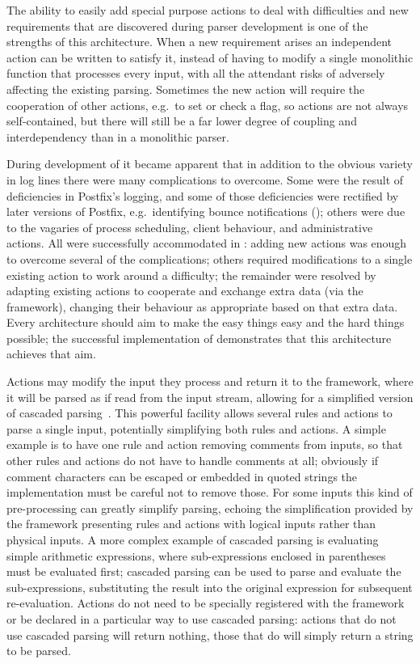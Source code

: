 The ability to easily add special purpose actions to deal with difficulties
and new requirements that are discovered during parser development is one
of the strengths of this architecture.  When a new requirement arises an
independent action can be written to satisfy it, instead of having to
modify a single monolithic function that processes every input, with all
the attendant risks of adversely affecting the existing parsing.  Sometimes
the new action will require the cooperation of other actions, e.g.\ to set
or check a flag, so actions are not always self-contained, but there will
still be a far lower degree of coupling and interdependency than in a
monolithic parser.

During development of \parsername{} it became apparent that in addition to
the obvious variety in log lines there were many complications to overcome.
Some were the result of deficiencies in Postfix's logging, and some of
those deficiencies were rectified by later versions of Postfix, e.g.\
identifying bounce notifications (\sectionref{identifying bounce
notifications}); others were due to the vagaries of process scheduling,
client behaviour, and administrative actions.  All were successfully
accommodated in \parsername{}: adding new actions was enough to overcome
several of the complications; others required modifications to a single
existing action to work around a difficulty; the remainder were resolved by
adapting existing actions to cooperate and exchange extra data (via the
framework), changing their behaviour as appropriate based on that extra
data.  Every architecture should aim to make the easy things easy and the
hard things possible; the successful implementation of \parsername{}
demonstrates that this architecture achieves that aim.

Actions may modify the input they process and return it to the framework,
where it will be parsed as if read from the input stream, allowing for a
simplified version of cascaded parsing~\cite{cascaded-parsing}.  This
powerful facility allows several rules and actions to parse a single input,
potentially simplifying both rules and actions.  A simple example is to
have one rule and action removing comments from inputs, so that other rules
and actions do not have to handle comments at all; obviously if comment
characters can be escaped or embedded in quoted strings the implementation
must be careful not to remove those.  For some inputs this kind of
pre-processing can greatly simplify parsing, echoing the simplification
provided by the framework presenting rules and actions with logical inputs
rather than physical inputs.  A more complex example of cascaded parsing is
evaluating simple arithmetic expressions, where sub-expressions enclosed in
parentheses must be evaluated first; cascaded parsing can be used to parse
and evaluate the sub-expressions, substituting the result into the original
expression for subsequent re-evaluation.  Actions do not need to be
specially registered with the framework or be declared in a particular way
to use cascaded parsing: actions that do not use cascaded parsing will
return nothing, those that do will simply return a string to be parsed.

